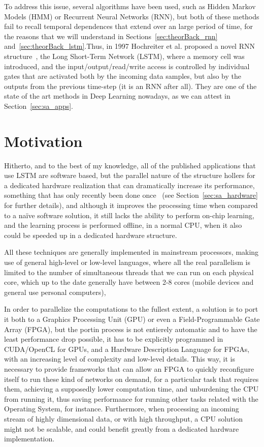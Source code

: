 To address this issue, several algorithms have been used, such as Hidden Markov Models (HMM) or Recurrent Neural Networks (RNN), but both of these methods fail to recall temporal dependences that extend over an large period of time, for the reasons that we will understand in Sections~\ref{sec:theorBack_rnn} and~\ref{sec:theorBack_lstm}.Thus, in 1997 Hochreiter et al. proposed a novel RNN structure~\cite{Hoch97}, the Long Short-Term Network (LSTM), where a memory cell was introduced, and the input/output/read/write access is controlled by individual gates that are activated both by the incoming data samples, but also by the outputs from the previous time-step (it is an RNN after all). They are one of the state of the art methods in Deep Learning nowadays, as we can attest in Section~\ref{sec:sa_apps}.

\section{Motivation}\label{sec:intro_mot}
Hitherto, and to the best of my knowledge, all of the published applications that use LSTM are software based, but the parallel nature of the structure hollers for a dedicated hardware realization that can dramatically increase its performance, something that  has only recently been done once~\cite{Chang15} (see Section~\ref{sec:sa_hardware} for further details), and although it improves the processing time when compared to a naïve software solution, it still lacks the ability to perform on-chip learning, and the learning process is performed offline, in a normal CPU, when it also could be speeded up in a dedicated hardware structure.

All these techniques are generally implemented in mainstream processors, making use of general high-level or low-level languages, where all the real parallelism is limited to the number of simultaneous threads that we can run on each physical core, which up to the date generally have between 2-8 cores (mobile devices and general use personal computers), 

In order to parallelize the computations to the fullest extent, a solution is to port it both to a Graphics Processing Unit (GPU) or even a Field-Programmable Gate Array (FPGA), but the portin process is not entierely automatic and to have the least performance drop possible, it has to be explicitly programmed in CUDA/OpenCL for GPUs, and a Hardware Description Language for FPGAs, with an increasing level of complexity and low-level details. This way, it is necessary to provide frameworks that can allow an FPGA to quickly reconfigure itself to run these kind of networks on demand, for a particular task that requires them, achieving a supposedly lower computation time, and unburdening the CPU from running it, thus saving performance for running other tasks related with the Operating System, for instance. Furthermore, when processing an incoming stream of highly dimensional data, or with high throughput, a CPU solution might not be scalable, and could benefit greatly from a dedicated hardware implementation.

